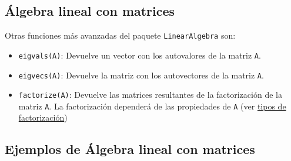 \documentclass[
  letterpaper,
  DIV=11,
  numbers=noendperiod]{scrreprt}
\providecommand{\tightlist}{%
  \setlength{\itemsep}{0pt}\setlength{\parskip}{0pt}}\usepackage{longtable,booktabs,array}
\begin{document}
\hypertarget{uxe1lgebra-lineal-con-matrices-2}{%
\subsection{Álgebra lineal con
matrices}\label{uxe1lgebra-lineal-con-matrices-2}}

Otras funciones más avanzadas del paquete \texttt{LinearAlgebra} son:

\begin{itemize}
\tightlist
\item
  \texttt{eigvals(A)}: Devuelve un vector con los autovalores de la
  matriz \texttt{A}.
\item
  \texttt{eigvecs(A)}: Devuelve la matriz con los autovectores de la
  matriz \texttt{A}.
\item
  \texttt{factorize(A)}: Devuelve las matrices resultantes de la
  factorización de la matriz \texttt{A}. La factorización dependerá de
  las propiedades de \texttt{A} (ver
  \href{https://docs.julialang.org/en/v1/stdlib/LinearAlgebra/\#man-linalg-factorizations}{tipos
  de factorización})
\end{itemize}

\hypertarget{ejemplos-de-uxe1lgebra-lineal-con-matrices}{%
\subsection{Ejemplos de Álgebra lineal con
matrices}\label{ejemplos-de-uxe1lgebra-lineal-con-matrices}}
\end{document}
